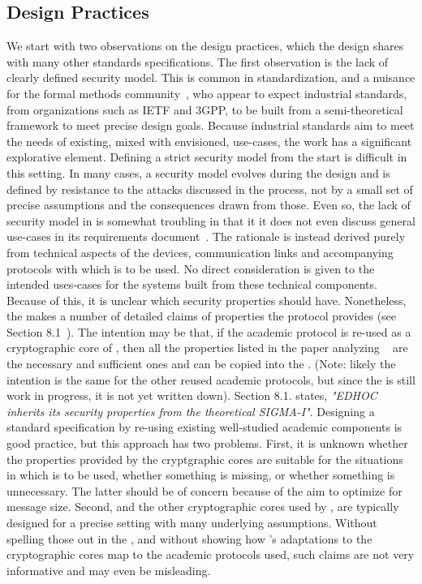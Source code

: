 \documentclass[runningheads]{llncs}
\begin{document}
\subsection{Design Practices}
\label{sec:designPractices}
We start with two observations on the design practices, which the \mEdhoc design
shares with many other standards specifications.
%
The first observation is the lack of clearly defined security model.
%
This is common in standardization, and a nuisance for the formal methods
community~\cite{DBLP:conf/ccs/BasinDHRSS18}, who appear to expect industrial
standards, from organizations such as IETF and 3GPP, to be built from a
semi-theoretical framework to meet precise design goals.
%
Because industrial standards aim to meet the needs of
existing, mixed with envisioned, use-cases, the work has a significant
explorative element.
%
Defining a strict security model from the start is difficult in this setting.
%
In many cases, a security model evolves during the design and is defined
by resistance to the attacks discussed in the process, not by a small set of
precise assumptions and the consequences drawn from those.
%
Even so, the lack of security model in \mEdhoc is somewhat troubling in that
it it does not even discuss general use-cases in its requirements
document~\cite{ietf-lake-reqs-04}.
%
The rationale is instead derived purely from technical aspects of the devices,
communication links and accompanying protocols with which \mEdhoc is to be used.
%
No direct consideration is given to the intended uses-cases for the systems
built from these technical components.
%
Because of this, it is unclear which security properties \mEdhoc should have.
%
Nonetheless, the \mSpec makes a number of detailed claims of properties
the protocol provides (see Section 8.1~\cite{selander-lake-edhoc-01}).
%
The intention may be that, if the academic protocol \mSigma is re-used as a
cryptographic core of \mEdhoc, then all the properties listed
in the paper analyzing \mSigma~\cite{DBLP:conf/crypto/CanettiK02} are the
necessary and sufficient ones and can be copied into the \mSpec.
%
(Note: likely the intention is the same for the other reused academic protocols,
but since the \mSpec is still work in progress, it is not yet written
down).
%
Section 8.1. states, \emph{"EDHOC inherits its security properties
from the theoretical SIGMA-I"}.
%
Designing a standard specification by re-using existing well-studied academic
components is good practice, but this approach has two problems.
%
First, it is unknown whether the properties provided by the cryptgraphic cores
are suitable for the situations in which \mEdhoc is to be used, whether
something is missing, or whether something is unnecessary.
%
The latter should be of concern because of the aim to optimize \mEdhoc for
message size.
%
Second, \mSigma and the other cryptographic cores used by \mEdhoc, are
typically designed for a precise setting with many underlying assumptions.
%
Without spelling those out in the \mSpec, and without showing how
\mEdhoc's adaptations to the cryptographic cores map to the academic protocols
used, such claims are not very informative and may even be misleading.
%
\end{document}

